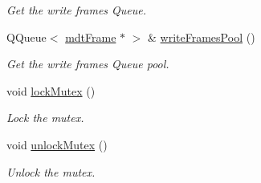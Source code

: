 \begin{DoxyCompactItemize}
\begin{DoxyCompactList}\small\item\em Get the write frames Queue. \end{DoxyCompactList}\item 
QQueue$<$ \hyperlink{classmdt_frame}{mdtFrame} $\ast$ $>$ \& \hyperlink{classmdt_abstract_port_abf093b67fddebffa4f3c52277b9a8cf7}{writeFramesPool} ()
\begin{DoxyCompactList}\small\item\em Get the write frames Queue pool. \end{DoxyCompactList}\item 
\hypertarget{classmdt_abstract_port_a6bf2ecdcf894da3929a22eb8793a9fe3}{
void \hyperlink{classmdt_abstract_port_a6bf2ecdcf894da3929a22eb8793a9fe3}{lockMutex} ()}
\label{classmdt_abstract_port_a6bf2ecdcf894da3929a22eb8793a9fe3}

\begin{DoxyCompactList}\small\item\em Lock the mutex. \end{DoxyCompactList}\item 
\hypertarget{classmdt_abstract_port_a3523c72a06e4d950338f91e56c286e84}{
void \hyperlink{classmdt_abstract_port_a3523c72a06e4d950338f91e56c286e84}{unlockMutex} ()}
\label{classmdt_abstract_port_a3523c72a06e4d950338f91e56c286e84}

\begin{DoxyCompactList}\small\item\em Unlock the mutex. \end{DoxyCompactList}\end{DoxyCompactItemize}
